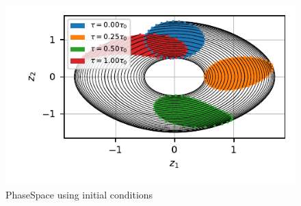 
\begin{figure}[h!]
    \centering
    \includegraphics{CodeAndFigures/PendulumPhaseSpaceUs2d.pdf}
    \caption{PhaseSpace using initial conditions }
    \label{fig:pend2d}
\end{figure}

